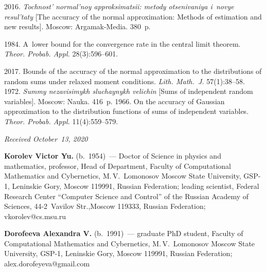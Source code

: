   \begin{multicols}{2}

\renewcommand{\bibname}{\protect\rmfamily References}

{\small\frenchspacing
 {%
 \begin{thebibliography}{9}
 2016. \textit{Tochnost' normal'noy approksimatsii: metody otsenivaniya 
i~novye resul'taty} [The accuracy of the normal approximation: 
Methods of estimation and new results]. Moscow: Argamak-Media. 380~p.
{

}

\columnbreak


 1984. A~lower bound for the convergence rate in the central limit theorem. 
\textit{Theor. Probab. Appl.} 28(3):596--601.

\vspace*{-2pt}

 2017. Bounds of the accuracy of the normal approximation to the distributions of random 
 sums under relaxed moment conditions. \textit{Lith. Math.~J.} 57(1):38--58.
 1972. \textit{Summy nezavisimykh sluchaynykh velichin} 
[Sums of independent random variables]. Moscow: Nauka. 416~p.
 1966. On the accuracy of Gaussian approximation to the distribution functions 
of sums of independent variables. \textit{Theor. Probab. Appl.} 11(4):559--579.
 \end{thebibliography}

 }
 }

\end{multicols}

\vspace*{-3pt}

  \hfill{\small\textit{Received October~13, 2020}}




\Contr

\noindent
\textbf{Korolev Victor Yu.} (b.\ 1954)~--- 
Doctor of Science in physics and mathematics, professor, Head of Department, Faculty of 
Computational Mathematics and Cybernetics, M.\,V.~Lomonosov Moscow State University, 
GSP-1, Leninskie Gory, Moscow 119991, Russian Federation; leading scientist, 
Federal Research Center ``Computer Science and Control'' 
of the Russian Academy of Sciences, 44-2~Vavilov Str.,Moscow 119333, Russian Federation; 
\mbox{vkorolev@cs.msu.ru}

\vspace*{6pt}

\noindent
\textbf{Dorofeeva Alexandra V.} (b.\ 1991)~--- 
graduate PhD student, Faculty of Computational Mathematics and Cybernetics, 
M.\,V.~Lomonosov Moscow State University, GSP-1, Leninskie Gory, Moscow 119991, 
Russian Federation; \mbox{alex.dorofeyeva@gmail.com}

\label{end\stat}

\renewcommand{\bibname}{\protect\rm Литература}